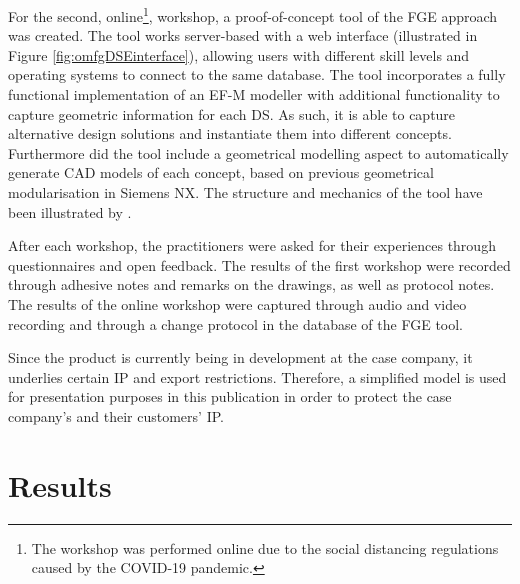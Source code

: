 \documentclass[aerospace,article,submit,moreauthors,pdftex]{Definitions/mdpi}
\newcommand{\Jakob}[1]{{{\color{orange}{\itshape{#1}}\color{black}}
    }{\ignorespaces}}
\begin{document}
For the second, online\footnote{The workshop was performed online due to the social distancing regulations caused by the COVID-19 pandemic.}, workshop, a proof-of-concept tool of the \ac{FGE} approach was created.
The tool works server-based with a web interface (illustrated in Figure \ref{fig:omfgDSEinterface}), allowing users with different skill levels and operating systems to connect to the same database.
The tool incorporates a fully functional implementation of an \ac{EF-M} modeller with additional functionality to capture geometric information for each \ac{DS}.
As such, it is able to capture alternative design solutions and instantiate them into different concepts.
Furthermore did the tool include a geometrical modelling aspect to automatically generate \ac{CAD} models of each concept, based on previous geometrical modularisation in Siemens NX.
The structure and mechanics of the tool have been illustrated by \cite{Muller2020a}.

After each workshop, the practitioners were asked for their experiences through questionnaires and open feedback.
The results of the first workshop were recorded through adhesive notes and remarks on the drawings, as well as protocol notes.
The results of the online workshop were captured through audio and video recording and through a change protocol in the database of the \ac{FGE} tool.


Since the product is currently being in development at the case company, it underlies certain \ac{IP} and export restrictions. 
Therefore, a simplified model is used for presentation purposes in this publication in order to protect the case company's and their customers' \ac{IP}.
% 



\section{Results}\label{sec:results}
\end{document}
